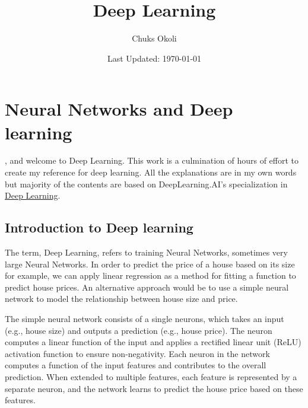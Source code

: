 \documentclass[letterpaper,12pt,notitlepage,twoside]{report}
\title{Deep Learning}
\author{Chuks Okoli}
\date{\footnotesize Last Updated: \today}
\makeatletter
\newcommand{\booktopic}{Deep Learning}
\newcommand*{\toccontents}{\@starttoc{toc}}
\makeatother
\begin{document}
\begin{titlepage}
  \pagestyle{plain}
  \maketitle
  \setcounter{tocdepth}{2}

  \toccontents
\end{titlepage}

\chapter{Neural Networks and Deep learning} \label{ch:1}

, and welcome to \booktopic. This work is a culmination of hours of effort to create my reference for deep learning. All the explanations are in my own words but majority of the contents are based on DeepLearning.AI's specialization in \href{https://www.deeplearning.ai/courses/deep-learning-specialization/}{Deep Learning}.


\section{Introduction to Deep learning}
The term, Deep Learning, refers to training Neural Networks, sometimes very large Neural Networks.  In order to predict the price of a house based on its size for example, we can apply linear regression as a method for fitting a function to predict house prices. An alternative approach would be to use a simple neural network to model the relationship between house size and price. 

The simple neural network consists of a single neurons, which takes an input (e.g., house size) and outputs a prediction (e.g., house price). The neuron computes a linear function of the input and applies a rectified linear unit (ReLU) activation function to ensure non-negativity. Each neuron in the network computes a function of the input features and contributes to the overall prediction. When extended to multiple features, each feature is represented by a separate neuron, and the network learns to predict the house price based on these features.
\end{document}
